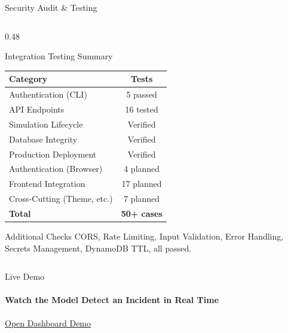 \documentclass[aspectratio=169,11pt]{beamer}
\begin{document}
\begin{frame}[shrink=15]{Security Audit \& Testing}
\begin{columns}[T]
\begin{column}{0.48\textwidth}
\begin{block}{Integration Testing Summary}
{\small
\begin{center}
\begin{tabular}{lc}
\toprule
\textbf{Category} & \textbf{Tests} \\
\midrule
Authentication (CLI) & 5 passed \\
API Endpoints & 16 tested \\
Simulation Lifecycle & Verified \\
Database Integrity & Verified \\
Production Deployment & Verified \\
\midrule
Authentication (Browser) & 4 planned \\
Frontend Integration & 17 planned \\
Cross-Cutting (Theme, etc.) & 7 planned \\
\midrule
\textbf{Total} & \textbf{50+ cases} \\
\bottomrule
\end{tabular}
\end{center}
}
\end{block}

\vspace{0.2em}
\begin{alertblock}{Additional Checks}
{\footnotesize CORS, Rate Limiting, Input Validation, Error Handling, Secrets Management, DynamoDB TTL, all passed.}
\end{alertblock}
\end{column}
\end{columns}
\end{frame}

\begin{frame}{Live Demo}
\framesubtitle{Watch the Model Detect an Incident in Real Time}

\centering
\vspace{1cm}

{\large \href{http://cloud-project-dashboard1.s3-website-us-east-1.amazonaws.com/}{Open Dashboard Demo}}

\end{frame}
\end{document}
